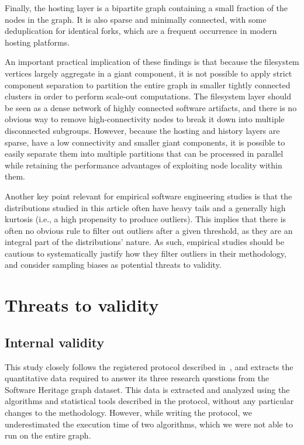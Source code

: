 Finally, the hosting layer is a bipartite graph containing a small fraction of
the nodes in the graph. It is also sparse and minimally connected, with some
deduplication for identical forks, which are a frequent occurrence in modern
hosting platforms.

An important practical implication of these findings is that because the
filesystem vertices largely aggregate in a giant component, it is not possible
to apply strict component separation to partition the entire graph in smaller
tightly connected clusters in order to perform scale-out computations. The
filesystem layer should be seen as a dense network of highly connected software
artifacts, and there is no obvious way to remove high-connectivity nodes to
break it down into multiple disconnected subgroups.  However, because the
hosting and history layers are sparse, have a low connectivity and smaller
giant components, it is possible to easily separate them into multiple
partitions that can be processed in parallel while retaining the performance
advantages of exploiting node locality within them.

Another key point relevant for empirical software engineering studies is that
the distributions studied in this article often have heavy tails and a
generally high kurtosis (i.e., a high propensity to produce outliers). This
implies that there is often no obvious rule to filter out outliers after a
given threshold, as they are an integral part of the distributions' nature.  As
such, empirical studies should be cautious to systematically justify how they
filter outliers in their methodology, and consider sampling biases as potential
threats to validity.

\section{Threats to validity}%
\label{sec:topology-threats}

\subsection{Internal validity}

This study closely follows the registered protocol described
in~\cite{msr-2020-topology}, and extracts the quantitative data required to
answer its three research questions from the Software Heritage graph dataset.
This data is extracted and analyzed using the algorithms and statistical tools
described in the protocol, without any particular changes to the methodology.
However, while writing the protocol, we underestimated the execution time of
two algorithms, which we were not able to run on the entire graph.

